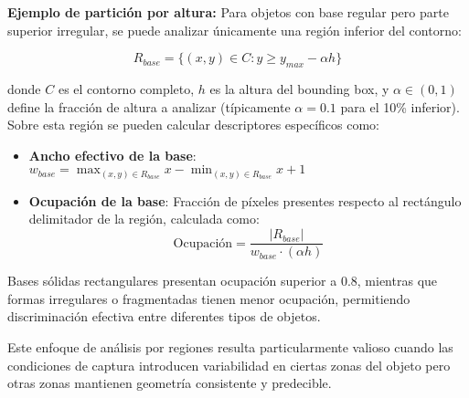 \textbf{Ejemplo de partición por altura:} Para objetos con base regular pero parte superior irregular, se puede analizar únicamente una región inferior del contorno:

\begin{equation}
R_{base} = \{(x,y) \in C : y \geq y_{max} - \alpha h\}
\end{equation}

donde $C$ es el contorno completo, $h$ es la altura del bounding box, y $\alpha \in (0,1)$ define la fracción de altura a analizar (típicamente $\alpha = 0.1$ para el 10\% inferior). Sobre esta región se pueden calcular descriptores específicos como:

\begin{itemize}
\item \textbf{Ancho efectivo de la base}: $w_{base} = \max_{(x,y) \in R_{base}} x - \min_{(x,y) \in R_{base}} x + 1$

\item \textbf{Ocupación de la base}: Fracción de píxeles presentes respecto al rectángulo delimitador de la región, calculada como:
\begin{equation}
\text{Ocupación} = \frac{|R_{base}|}{w_{base} \cdot (\alpha h)}
\end{equation}
\end{itemize}

Bases sólidas rectangulares presentan ocupación superior a 0.8, mientras que formas irregulares o fragmentadas tienen menor ocupación, permitiendo discriminación efectiva entre diferentes tipos de objetos.

Este enfoque de análisis por regiones resulta particularmente valioso cuando las condiciones de captura introducen variabilidad en ciertas zonas del objeto pero otras zonas mantienen geometría consistente y predecible.
